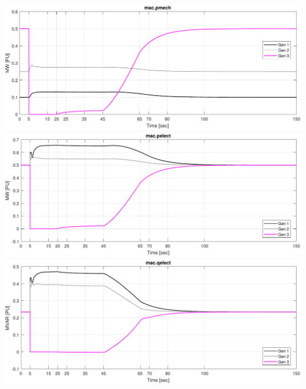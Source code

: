 \pagebreak
\includegraphics[width=\linewidth]{examples/untrip/combinedPmech}
\includegraphics[width=\linewidth]{examples/untrip/combinedPelect}
\includegraphics[width=\linewidth]{examples/untrip/combinedQelect}

